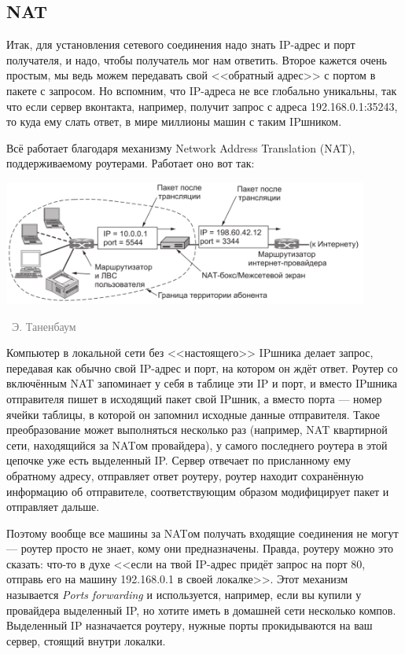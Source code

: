 \documentclass[a5paper]{article}
\newcommand{\attribution}[1] {
\vspace{-5mm}\begin{flushright}\begin{scriptsize}\textcolor{gray}{\textcopyright\, #1}\end{scriptsize}\end{flushright}
}
\begin{document}
\subsection{NAT}

Итак, для установления сетевого соединения надо знать IP-адрес и порт получателя, и надо, чтобы получатель мог нам ответить. Второе кажется очень простым, мы ведь можем передавать свой <<обратный адрес>> с портом в пакете с запросом. Но вспомним, что IP-адреса не все глобально уникальны, так что если сервер вконтакта, например, получит запрос с адреса 192.168.0.1:35243, то куда ему слать ответ, в мире миллионы машин с таким IPшником.

Всё работает благодаря механизму Network Address Translation (NAT), поддерживаемому роутерами. Работает оно вот так:

\begin{center}
    \includegraphics[width=0.9\textwidth]{nat.png}
    \attribution{Э. Таненбаум}
\end{center}

Компьютер в локальной сети без <<настоящего>> IPшника делает запрос, передавая как обычно свой IP-адрес и порт, на котором он ждёт ответ. Роутер со включённым NAT запоминает у себя в таблице эти IP и порт, и вместо IPшника отправителя пишет в исходящий пакет свой IPшник, а вместо порта --- номер ячейки таблицы, в которой он запомнил исходные данные отправителя. Такое преобразование может выполняться несколько раз (например, NAT квартирной сети, находящийся за NATом провайдера), у самого последнего роутера в этой цепочке уже есть выделенный IP. Сервер отвечает по присланному ему обратному адресу, отправляет ответ роутеру, роутер находит сохранённую информацию об отправителе, соответствующим образом модифицирует пакет и отправляет дальше.

Поэтому вообще все машины за NATом получать входящие соединения не могут --- роутер просто не знает, кому они предназначены. Правда, роутеру можно это сказать: что-то в духе <<если на твой IP-адрес придёт запрос на порт 80, отправь его на машину 192.168.0.1 в своей локалке>>. Этот механизм называется \textit{Ports forwarding} и используется, например, если вы купили у провайдера выделенный IP, но хотите иметь в домашней сети несколько компов. Выделенный IP назначается роутеру, нужные порты прокидываются на ваш сервер, стоящий внутри локалки.
\end{document}
